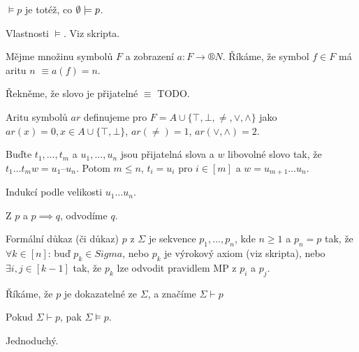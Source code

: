 \documentclass[12pt]{article}                   %
\begin{document}
    \begin{poznamka}
        $\models p$ je totéž, co $\emptyset \models p$.
    \end{poznamka}

    \begin{lemma}
        Vlastnosti $\models$. Viz skripta.
    \end{lemma}

    \begin{definice}[Arita]
        Mějme množinu symbolů $F$ a zobrazení $a: F \rightarrow ®N$. Říkáme, že symbol $f \in F$ má aritu $n$ $≡ a(f) = n$.

        Řekněme, že slovo je přijatelné $≡$ TODO.
    \end{definice}

    \begin{definice}
        Aritu symbolů $ar$ definujeme pro $F = A \cup \{\top, \bot, \neq, \lor, \land\}$ jako $ar(x) = 0, x\in A \cup \{\top, \bot\}$, $ar(\neq) = 1$, $ar(\lor, \land) = 2$.
    \end{definice}

    \begin{lemma}
        Buďte $t_1, …, t_m$ a $u_1, …, u_n$ jsou přijatelná slova a $w$ libovolné slovo tak, že $t_1…t_mw=u_1–u_n$. Potom $m ≤ n$, $t_i = u_i$ pro $i \in [m]$ a $w = u_{m+1}…u_n$.

        \begin{dukazin}
            Indukcí podle velikosti $u_1…u_n$.
        \end{dukazin}
    \end{lemma}


    \begin{definice}[Modus Ponens (= MP = odvozovací pravidla)]
        Z $p$ a $p \implies q$, odvodíme $q$.
    \end{definice}

    \begin{definice}[Důkaz]
        Formální důkaz (či důkaz) $p$ z $\Sigma$ je sekvence $p_1, …, p_n$, kde $n≥1$ a $p_n = p$ tak, že $\forall k \in [n]$: buď $p_k \in Sigma$, nebo $p_k$ je výrokový axiom (viz skripta), nebo $\exists i, j \in [k-1]$ tak, že $p_k$ lze odvodit pravidlem MP z $p_i$ a $p_j$.

        Říkáme, že $p$ je dokazatelné ze $\Sigma$, a značíme $\Sigma \vdash p$
    \end{definice}

    \begin{tvrzeni}
        Pokud $\Sigma \vdash p$, pak $\Sigma \models p$.

        \begin{dukazin}
            Jednoduchý.
        \end{dukazin}
    \end{tvrzeni}
\end{document}
